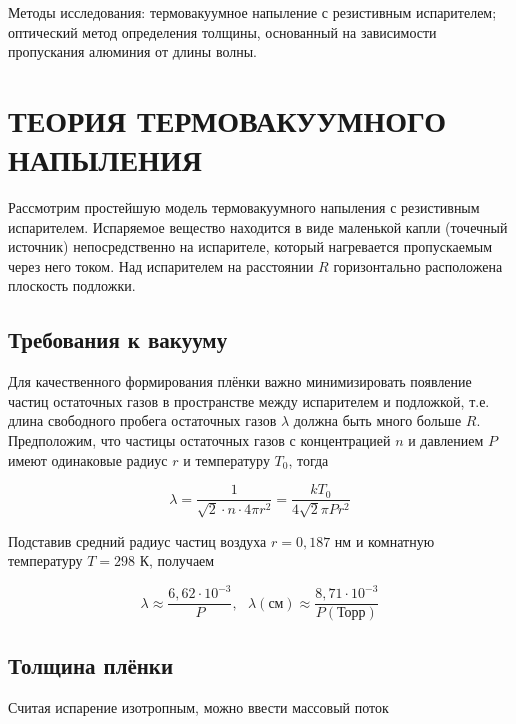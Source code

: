 \documentclass[a4paper, 14pt]{extarticle}
\begin{document}
	
	Методы исследования: термовакуумное напыление с резистивным
	испарителем; оптический метод определения толщины, основанный на зависимости
	пропускания алюминия от длины волны.
	
	
	\section{ТЕОРИЯ ТЕРМОВАКУУМНОГО НАПЫЛЕНИЯ}

	
	\hspace{11mm} Рассмотрим простейшую модель термовакуумного напыления с резистивным испарителем. Испаряемое вещество находится в виде маленькой капли (точечный источник) непосредственно на испарителе, который нагревается пропускаемым через него током. Над испарителем на расстоянии $R$ горизонтально расположена плоскость подложки.
	
	\subsection{Требования к вакууму}
	
	\hspace{11mm} Для качественного формирования плёнки важно минимизировать появление частиц остаточных газов в пространстве между испарителем и подложкой, т.е. длина свободного пробега остаточных газов $\lambda$ должна быть много больше $R$. Предположим, что частицы остаточных газов с концентрацией $n$ и давлением $P$ имеют одинаковые радиус $r$ и температуру $T_0$, тогда
	
	\begin{equation}
		\lambda = \frac{1}{\sqrt{2}\cdot n\cdot 4\pi r^2} = \frac{kT_0}{4\sqrt{2}\pi P r^2}
	\end{equation}	
	
	Подставив средний радиус частиц воздуха $r = 0,187$ нм и комнатную температуру $T= 298$ К, получаем
	
	\begin{equation}
		\lambda \approx \frac{6,62\cdot 10^{-3}}{P}, \ \ \ \lambda(\text{см}) \approx \frac{8,71\cdot 10^{-3}}{P(\text{Торр})}
	\end{equation}	
	
	
	
	\subsection{Толщина плёнки}
	
	\hspace{11mm} Считая испарение изотропным, можно ввести массовый поток 
	
\end{document}
